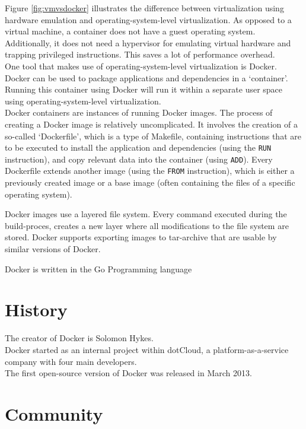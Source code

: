 Figure \ref{fig:vmvsdocker} illustrates the difference between virtualization using hardware emulation and operating-system-level virtualization. As opposed to a virtual machine, a container does not have a guest operating system. Additionally, it does not need a hypervisor for emulating virtual hardware and trapping privileged instructions. This saves a lot of performance overhead. \\

One tool that makes use of operating-system-level virtualization is Docker. Docker can be used to package applications and dependencies in a `container'. Running this container using Docker will run it within a separate user space using operating-system-level virtualization. \\
Docker containers are instances of running Docker images. The process of creating a Docker image is relatively uncomplicated. It involves the creation of a so-called `Dockerfile', which is a type of Makefile, containing instructions that are to be executed to install the application and dependencies (using the \verb|RUN| instruction), and copy relevant data into the container (using \verb|ADD|). Every Dockerfile extends another image (using the \verb|FROM| instruction), which is either a previously created image or a base image (often containing the files of a specific operating system).

Docker images use a layered file system. Every command executed during the build-proces, creates a new layer where all modifications to the file system are stored.
Docker supports exporting images to tar-archive that are usable by similar versions of Docker.

Docker is written in the Go Programming language \\

\section{History}
The creator of Docker is Solomon Hykes. \\
Docker started as an internal project within dotCloud, a platform-as-a-service company with four main developers. \\
The first open-source version of Docker was released in March 2013.\\

\section{Community}

